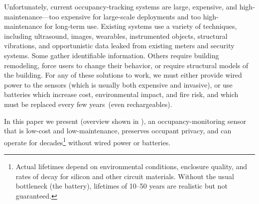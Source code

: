 Unfortunately, current occupancy-tracking systems are large, expensive, and high-maintenance---too expensive for large-scale deployments and too high-maintenance for long-term use.
%
Existing systems use a variety of techniques, including ultrasound\cite{hnat2012doorjamb}, images\cite{tyndall2016occupancy, teixeira2007lightweight}, wearables\cite{fishkin2005hands}, instrumented objects\cite{buettner2009activity}, structural vibrations\cite{pan2016occupant}, and opportunistic data leaked from existing meters and security systems\cite{yangoccupancy2014}.
Some gather identifiable information.  %
Others require building remodeling, force users to change their behavior, or require structural models of the building.
For any of these solutions to work, we must either provide wired power to the sensors (which is usually both expensive and invasive), or use batteries which increase cost, environmental impact, and fire risk, and which must be replaced every few years~(even rechargeables).

In this paper we present \sysname (overview shown in ), an occupancy-monitoring sensor that is low-cost and low-maintenance, preserves occupant privacy, and can operate for decades\footnote{Actual lifetimes depend on environmental conditions, enclosure quality, and rates of decay for silicon and other circuit materials. Without the usual bottleneck (the battery), lifetimes of 10--50 years are realistic but not guaranteed.} without wired power or batteries.
%


